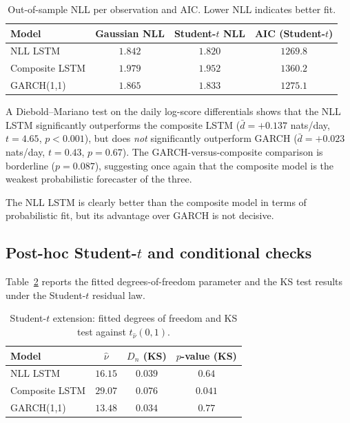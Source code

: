 \documentclass[%
 amsmath,amssymb,
 aps,
 pra,
 floatfix,
 raggedbottom,
 nofootinbib,
12pt,]{revtex4-2}
\providecommand{\texorpdfstring}[2]{#1}
\begin{document}
\begin{table}[htbp]
\centering
\caption{Out-of-sample NLL per observation and AIC. Lower NLL indicates better fit.}
\label{tab:nllcompare}
\begin{ruledtabular}
\begin{tabular}{lccc}
\textbf{Model} & \textbf{Gaussian NLL} & \textbf{Student-$t$ NLL} & \textbf{AIC (Student-$t$)} \\
\hline
NLL LSTM       & $1.842$ & $1.820$ & $1269.8$ \\
Composite LSTM & $1.979$ & $1.952$ & $1360.2$ \\
GARCH(1,1)     & $1.865$ & $1.833$ & $1275.1$ \\
\end{tabular}
\end{ruledtabular}
\end{table}

A Diebold--Mariano test \citep{diebold1995comparing} on the daily log-score differentials shows that the NLL LSTM significantly outperforms the composite LSTM ($\bar{d}=+0.137$ nats/day, $t=4.65$, $p<0.001$), but does \emph{not} significantly outperform GARCH ($\bar{d}=+0.023$ nats/day, $t=0.43$, $p=0.67$). The GARCH-versus-composite comparison is borderline ($p=0.087$), suggesting once again that the composite model is the weakest probabilistic forecaster of the three.

The NLL LSTM is clearly better than the composite model in terms of probabilistic fit, but its advantage over GARCH is not decisive.

\subsection{\texorpdfstring{Post-hoc Student-$t$ and conditional checks}{Post-hoc Student-t and conditional checks}}

Table~\ref{tab:student_t} reports the fitted degrees-of-freedom parameter and the KS test results under the Student-$t$ residual law.

\begin{table}[htbp]
\centering
\caption{Student-$t$ extension: fitted degrees of freedom and KS test against $t_{\hat{\nu}}(0,1)$.}
\label{tab:student_t}
\begin{ruledtabular}
\begin{tabular}{lccc}
\textbf{Model} & $\hat{\nu}$ & $D_n$ \textbf{(KS)} & $p$\textbf{-value (KS)} \\
\hline
NLL LSTM       & $16.15$ & $0.039$ & $0.64$ \\
Composite LSTM & $29.07$ & $0.076$ & $0.041$ \\
GARCH(1,1)     & $13.48$ & $0.034$ & $0.77$ \\
\end{tabular}
\end{ruledtabular}
\end{table}
\end{document}
